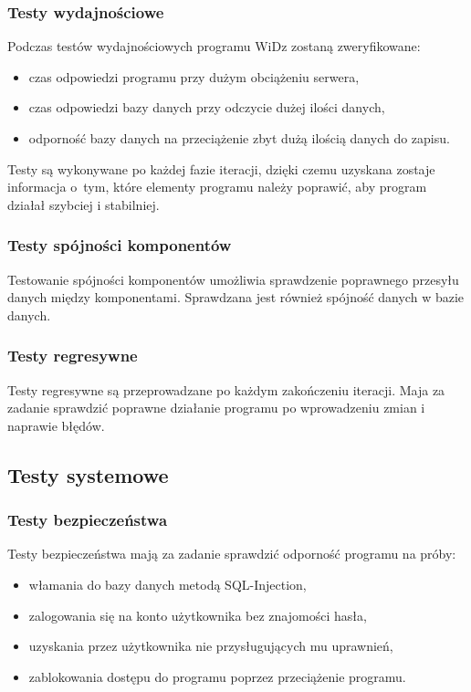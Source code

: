 \documentclass[12pt,leqno,twoside]{mwart}
\begin{document}
\subsubsection{Testy wydajnościowe}
\noindent Podczas testów wydajnościowych programu WiDz zostaną zweryfikowane:
\begin{itemize}
	\item czas odpowiedzi programu przy dużym obciążeniu serwera,
	\item czas odpowiedzi bazy danych przy odczycie dużej ilości danych,
	\item odporność bazy danych na przeciążenie zbyt dużą ilością danych do zapisu.
\end{itemize}
\indent Testy są wykonywane po każdej fazie iteracji, dzięki czemu uzyskana zostaje informacja o~tym, które elementy programu należy poprawić, aby program działał szybciej i stabilniej. \\
\subsubsection{Testy spójności komponentów}
\noindent Testowanie spójności komponentów umożliwia sprawdzenie poprawnego przesyłu danych między komponentami. Sprawdzana jest również spójność danych w bazie danych. \\
\subsubsection{Testy regresywne}
\noindent Testy regresywne są przeprowadzane po każdym zakończeniu iteracji. Maja za zadanie sprawdzić poprawne działanie programu po wprowadzeniu zmian i naprawie błędów.\\
\subsection{Testy systemowe}
\subsubsection{Testy bezpieczeństwa}
\noindent Testy bezpieczeństwa mają za zadanie sprawdzić odporność programu na próby:
\begin{itemize}
	\item włamania do bazy danych metodą SQL-Injection,
	\item zalogowania się na konto użytkownika bez znajomości hasła,
	\item uzyskania przez użytkownika nie przysługujących mu uprawnień,
	\item zablokowania dostępu do programu poprzez przeciążenie programu.
\end{itemize}
\end{document}
